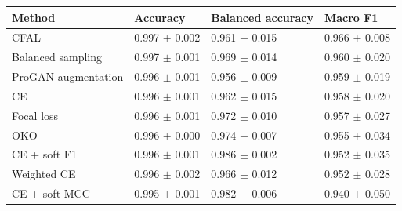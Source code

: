 \begin{tabular}{llll}
\toprule
Method & Accuracy & Balanced accuracy & Macro F1\\
\midrule
CFAL & \num{0.997} $\pm$ \num{0.002} & \num{0.961} $\pm$ \num{0.015} & \num{0.966} $\pm$ \num{0.008}\\
Balanced sampling & \num{0.997} $\pm$ \num{0.001} & \num{0.969} $\pm$ \num{0.014} & \num{0.960} $\pm$ \num{0.020}\\
ProGAN augmentation & \num{0.996} $\pm$ \num{0.001} & \num{0.956} $\pm$ \num{0.009} & \num{0.959} $\pm$ \num{0.019}\\
CE & \num{0.996} $\pm$ \num{0.001} & \num{0.962} $\pm$ \num{0.015} & \num{0.958} $\pm$ \num{0.020}\\
Focal loss & \num{0.996} $\pm$ \num{0.001} & \num{0.972} $\pm$ \num{0.010} & \num{0.957} $\pm$ \num{0.027}\\
OKO & \num{0.996} $\pm$ \num{0.000} & \num{0.974} $\pm$ \num{0.007} & \num{0.955} $\pm$ \num{0.034}\\
CE + soft F1 & \num{0.996} $\pm$ \num{0.001} & \num{0.986} $\pm$ \num{0.002} & \num{0.952} $\pm$ \num{0.035}\\
Weighted CE & \num{0.996} $\pm$ \num{0.002} & \num{0.966} $\pm$ \num{0.012} & \num{0.952} $\pm$ \num{0.028}\\
CE + soft MCC & \num{0.995} $\pm$ \num{0.001} & \num{0.982} $\pm$ \num{0.006} & \num{0.940} $\pm$ \num{0.050}\\
\bottomrule
\end{tabular}
